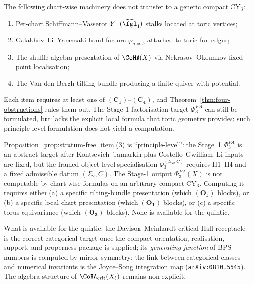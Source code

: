 \begin{proposition}
\label{prop:transfer-failures}
The following chart-wise machinery does not transfer to a generic
compact CY$_3$:
\begin{enumerate}[leftmargin=2em]
\item Per-chart Schiffmann--Vasserot $Y^+(\widehat{\fgl}_1)$ stalks
 located at toric vertices;
\item Galakhov--Li--Yamazaki bond factors $\varphi_{a \Rightarrow b}$
 attached to toric fan edges;
\item The shuffle-algebra presentation of $\CoHA(X)$ via
 Nekrasov--Okounkov fixed-point localisation;
\item The Van den Bergh tilting bundle producing a finite quiver with
 potential.
\end{enumerate}
\end{proposition}

Each item requires at least one of $(\mathbf{C_1})$--$(\mathbf{C_4})$,
and Theorem~\ref{thm:four-obstructions} rules them out. The Stage-1
factorisation target $\Phi^{FA}_3$ can still be formulated, but lacks
the explicit local formula that toric geometry provides; such
principle-level formulation does not yield a computation.

\begin{remark}
\label{rem:principle-level}
Proposition~\ref{prop:stratum-free} item (3) is ``principle-level'': the
Stage~1 $\Phi^{FA}_3$ is an abstract target after
Kontsevich--Tamarkin plus Costello--Gwilliam--Li inputs are fixed, but
the framed object-level specialisation
$\Phi_3^{(\Sigma_2,C)}$ requires H1--H4 and a fixed admissible datum
$(\Sigma_2,C)$. The Stage-1 output $\Phi^{FA}_3(X)$ is not computable
by chart-wise formulas on an arbitrary compact CY$_3$.
Computing it requires either (a) a specific tilting-bundle presentation
(which $(\mathbf{O_4})$ blocks), or (b) a specific local chart
presentation (which $(\mathbf{O_1})$ blocks), or (c) a specific torus
equivariance (which $(\mathbf{O_3})$ blocks). None is available for the
quintic.

What is available for the quintic: the Davison--Meinhardt
critical-Hall receptacle is the correct categorical target once the
compact orientation, realisation, support, and properness package is
supplied; its \emph{generating function} of BPS numbers is computed by
mirror symmetry; the link between categorical classes and numerical
invariants is the Joyce--Song integration map
(\texttt{arXiv:0810.5645}). The algebra structure of
$\CoHA_{\mathrm{crit}}(X_5)$ remains non-explicit.
\end{remark}
